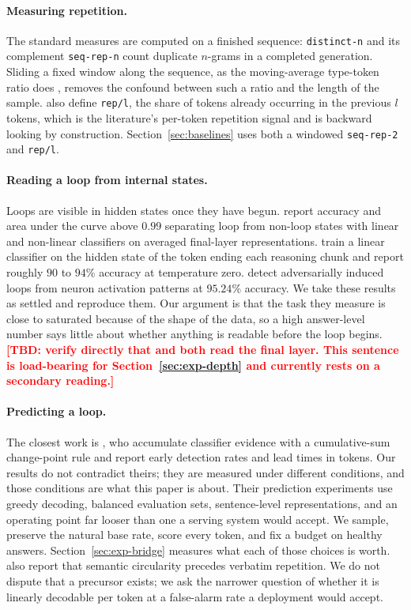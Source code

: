 \documentclass{article}
\newcommand{\TBD}[1]{\textcolor{red}{\textbf{[TBD: #1]}}}
\begin{document}
\paragraph{Measuring repetition.}
The standard measures are computed on a finished sequence: \texttt{distinct-n}
\citep{li2016diversity} and its complement \texttt{seq-rep-n}
\citep{welleck2020neural} count duplicate $n$-grams in a completed generation.
Sliding a fixed window along the sequence, as the moving-average type-token ratio
does \citep{covington2010cutting}, removes the confound between such a ratio and
the length of the sample. \citet{welleck2020neural} also define \texttt{rep/l},
the share of tokens already occurring in the previous $l$ tokens, which is the
literature's per-token repetition signal and is backward looking by
construction. Section~\ref{sec:baselines} uses both a windowed
\texttt{seq-rep-2} and \texttt{rep/l}.

\paragraph{Reading a loop from internal states.}
Loops are visible in hidden states once they have begun.
\citet{duan2026circular} report accuracy and area under the curve above $0.99$
separating loop from non-loop states with linear and non-linear classifiers on
averaged final-layer representations. \citet{xie2025wordsalad} train a linear
classifier on the hidden state of the token ending each reasoning chunk and
report roughly $90$ to $94\%$ accuracy at temperature zero. \citet{yu2025breaking}
detect adversarially induced loops from neuron activation patterns at $95.24\%$
accuracy. We take these results as settled and reproduce them. Our argument is
that the task they measure is close to saturated because of the shape of the
data, so a high answer-level number says little about whether anything is
readable before the loop begins. \TBD{verify directly that
\citet{duan2026circular} and \citet{xie2025wordsalad} both read the final layer.
This sentence is load-bearing for Section~\ref{sec:exp-depth} and currently rests
on a secondary reading.}

\paragraph{Predicting a loop.}
The closest work is \citet{duan2026circular}, who accumulate classifier evidence
with a cumulative-sum change-point rule \citep{page1954continuous} and report
early detection rates and lead times in tokens. Our results do not contradict
theirs; they are measured under different conditions, and those conditions are
what this paper is about. Their prediction experiments use greedy decoding,
balanced evaluation sets, sentence-level representations, and an operating point
far looser than one a serving system would accept. We sample, preserve the
natural base rate, score every token, and fix a budget on healthy answers.
Section~\ref{sec:exp-bridge} measures what each of those choices is worth.
\citet{duan2026circular} also report that semantic circularity precedes verbatim
repetition. We do not dispute that a precursor exists; we ask the narrower
question of whether it is linearly decodable per token at a false-alarm rate a
deployment would accept.
\end{document}
